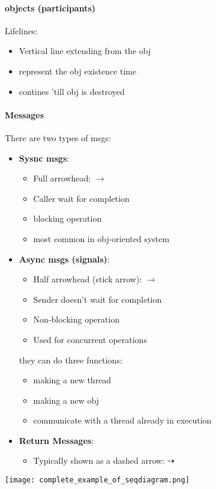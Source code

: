 \paragraph{objects (participants)}

Lifelines:
\begin{itemize}
    \item Vertical line extending from the obj
    \item represent the obj existence time
    \item contines 'till obj is destroyed
\end{itemize}

\paragraph{Messages} There are two types of msgs:
\begin{itemize}
    \item \textbf{Sysnc msgs}:
    \begin{itemize}
        \item Full arrowhead: $ \longrightarrow $
        \item Caller wait for completion
        \item blocking operation
        \item most common in obj-oriented system
    \end{itemize}
    \item \textbf{Async msgs (signals)}:
    \begin{itemize}
        \item Half arrowhead (stick arrow): $ \rightarrow $
        \item Sender doesn't wait for completion
        \item Non-blocking operation
        \item Used for concurrent operations
    \end{itemize}
    they can do three functions:
    \begin{itemize}
        \item making a new thread
        \item making a new obj
        \item communicate with a thread already in execution
    \end{itemize}
    \item \textbf{Return Messages}:
    \begin{itemize}
        \item Typically shown as a dashed arrow: $ \dashrightarrow $
    \end{itemize}
\end{itemize}

\begin{center}
    \texttt{[image: complete\_example\_of\_seqdiagram.png]}
\end{center}